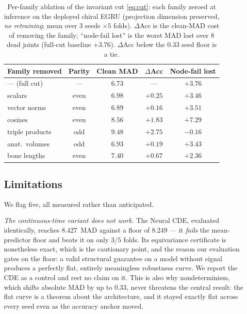 \begin{table}[!t]
\centering
\caption{Per-family ablation of the invariant cut \eqref{eq:cut}: each family zeroed at inference on
the deployed chiral EGRU (projection dimension preserved, \emph{no retraining}; mean over $3$ seeds
$\times5$ folds). $\Delta$Acc is the clean-MAD cost of removing the family; ``node-fail lost'' is the
worst MAD lost over $8$ dead joints (full-cut baseline $+3.76$). $\Delta$Acc below the $0.33$ seed
floor is a tie.}
\label{tab:ablation}
\scriptsize
\setlength{\tabcolsep}{4pt}
\begin{tabular}{lcccc}
\toprule
Family removed & Parity & Clean MAD & $\Delta$Acc & Node-fail lost \\
\midrule
--- (full cut)   & ---   & $6.73$ & ---            & $+3.76$ \\
scalars          & even  & $6.98$ & $+0.25$        & $+3.46$ \\
vector norms     & even  & $6.89$ & $+0.16$        & $+3.51$ \\
cosines          & even  & $8.56$ & $\mathbf{+1.83}$ & $\mathbf{+7.29}$ \\
triple products  & odd   & $9.48$ & $\mathbf{+2.75}$ & $-0.16$ \\
anat.\ volumes   & odd   & $6.93$ & $+0.19$        & $+3.43$ \\
bone lengths     & even  & $7.40$ & $+0.67$        & $+2.36$ \\
\bottomrule
\end{tabular}
\end{table}

\subsection{Limitations}
\label{sec:results:limits}

We flag five, all measured rather than anticipated.

\emph{The continuous-time variant does not work.} The Neural CDE, evaluated identically, reaches
$8.427$~MAD against a floor of $8.249$ --- it \emph{fails} the mean-predictor floor and beats it on
only $3/5$ folds. Its equivariance certificate is nonetheless exact, which is the cautionary point,
and the reason our evaluation gates on the floor: a valid structural guarantee on a model without
signal produces a perfectly flat, entirely meaningless robustness curve. We report the CDE as a
control and rest no claim on it. This is also why nondeterminism, which shifts absolute MAD by up to
$0.33$, never threatens the central result: the flat curve is a theorem about the architecture, and
it stayed exactly flat across every seed even as the accuracy anchor moved.

